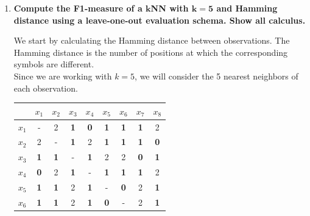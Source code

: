 \documentclass[12pt]{article}
\begin{document}
\vspace{10pt}
\begin{enumerate}[leftmargin=\labelsep]
    \item \textbf{Compute the F1-measure of a $\mathbf{k}$NN with $\mathbf{k =  5}$ and Hamming distance using a
    leave-one-out evaluation schema. Show all calculus.}

    \vspace{10pt}
    We start by calculating the Hamming distance between observations. The Hamming distance is the number of positions at which the corresponding symbols are different.\\
    Since we are working with $k = 5$, we will consider the 5 nearest neighbors of each observation.
    \vspace{10pt}
    
    \begin{table}[H]
        \begin{center}
            \begin{tabular}{c|cccccccc}
            & $x_1$ & $x_2$ & $x_3$ & $x_4$ & $x_5$ & $x_6$ & $x_7$ & $x_8$\\ 
            \hline
                $x_1$ & \-- & 2 & \textbf{\textcolor{codegreen}{1}} & \textbf{\textcolor{codegreen}{0}} & \textbf{\textcolor{codepink}{1}} & \textbf{\textcolor{codepink}{1}} & \textbf{\textcolor{codepink}{1}} & 2 \\ 
                $x_2$ & 2 & \-- & \textbf{\textcolor{codegreen}{1}} & 2 & \textbf{\textcolor{codepink}{1}} & \textbf{\textcolor{codepink}{1}} & \textbf{\textcolor{codepink}{1}} & \textbf{\textcolor{codepink}{0}} \\ 
                $x_3$ & \textbf{\textcolor{codegreen}{1}} & \textbf{\textcolor{codegreen}{1}} & \-- & \textbf{\textcolor{codegreen}{1}} & 2 & 2 & \textbf{\textcolor{codepink}{0}} & \textbf{\textcolor{codepink}{1}} \\ 
                $x_4$ & \textbf{\textcolor{codegreen}{0}} & 2 & \textbf{\textcolor{codegreen}{1}} & \-- & \textbf{\textcolor{codepink}{1}} & \textbf{\textcolor{codepink}{1}} & \textbf{\textcolor{codepink}{1}} & 2 \\ 
                $x_5$ & \textbf{\textcolor{codegreen}{1}} & \textbf{\textcolor{codegreen}{1}} & 2 & \textbf{\textcolor{codegreen}{1}} & \-- & \textbf{\textcolor{codepink}{0}} & 2 & \textbf{\textcolor{codepink}{1}} \\ 
                $x_6$ & \textbf{\textcolor{codegreen}{1}} & \textbf{\textcolor{codegreen}{1}} & 2 & \textbf{\textcolor{codegreen}{1}} & \textbf{\textcolor{codepink}{0}} & \-- & 2 & \textbf{\textcolor{codepink}{1}} \\ 

\end{tabular}
\end{center}
\end{table}
\end{enumerate}
\end{document}
